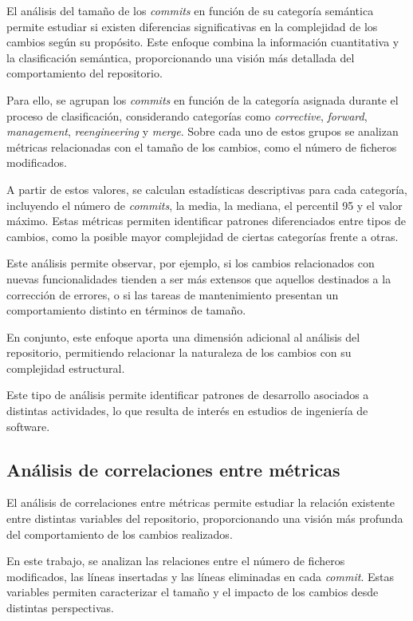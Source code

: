 \documentclass[a4paper, 12pt]{book}
\begin{document}
El análisis del tamaño de los \emph{commits} en función de su categoría semántica permite estudiar si existen diferencias significativas en la complejidad de los cambios según su propósito. Este enfoque combina la información cuantitativa y la clasificación semántica, proporcionando una visión más detallada del comportamiento del repositorio.

Para ello, se agrupan los \emph{commits} en función de la categoría asignada durante el proceso de clasificación, considerando categorías como \emph{corrective}, \emph{forward}, \emph{management}, \emph{reengineering} y \emph{merge}. Sobre cada uno de estos grupos se analizan métricas relacionadas con el tamaño de los cambios, como el número de ficheros modificados.

A partir de estos valores, se calculan estadísticas descriptivas para cada categoría, incluyendo el número de \emph{commits}, la media, la mediana, el percentil 95 y el valor máximo. Estas métricas permiten identificar patrones diferenciados entre tipos de cambios, como la posible mayor complejidad de ciertas categorías frente a otras.

Este análisis permite observar, por ejemplo, si los cambios relacionados con nuevas funcionalidades tienden a ser más extensos que aquellos destinados a la corrección de errores, o si las tareas de mantenimiento presentan un comportamiento distinto en términos de tamaño.

En conjunto, este enfoque aporta una dimensión adicional al análisis del repositorio, permitiendo relacionar la naturaleza de los cambios con su complejidad estructural.

Este tipo de análisis permite identificar patrones de desarrollo asociados a distintas actividades, lo que resulta de interés en estudios de ingeniería de software.

\subsection{Análisis de correlaciones entre métricas}
\label{subsec:rq7}

El análisis de correlaciones entre métricas permite estudiar la relación existente entre distintas variables del repositorio, proporcionando una visión más profunda del comportamiento de los cambios realizados.

En este trabajo, se analizan las relaciones entre el número de ficheros modificados, las líneas insertadas y las líneas eliminadas en cada \emph{commit}. Estas variables permiten caracterizar el tamaño y el impacto de los cambios desde distintas perspectivas.
\end{document}
